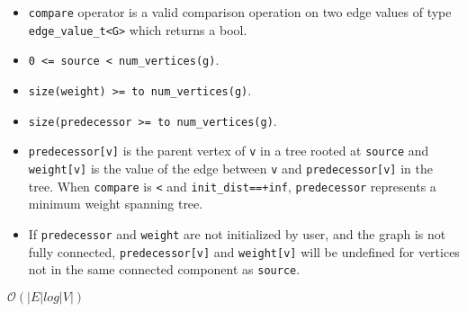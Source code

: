{\small
      
}

\begin{itemdescr}
      \pnum\mandates
            \begin{itemize}
                  \item
                        \lstinline{compare} operator is a valid comparison operation on two edge values of type \lstinline{edge_value_t<G>} which returns a bool.
            \end{itemize}
      \pnum\hardprecond
            \begin{itemize}
                  \item
                        \lstinline{0 <= source < num_vertices(g)}.
                  \item
                        \lstinline{size(weight) >= to num_vertices(g)}.
                  \item
                        \lstinline{size(predecessor >= to num_vertices(g)}.
            \end{itemize}
      \pnum\effects
            \begin{itemize}
                  \item
                        \lstinline{predecessor[v]} is the parent vertex of \lstinline{v} in a tree rooted at \lstinline{source} and \lstinline{weight[v]} is the value of the edge between \lstinline{v} and \lstinline{predecessor[v]} in the tree. When \lstinline{compare} is \lstinline{<} and \lstinline{init_dist==+inf}, \lstinline{predecessor} represents a minimum weight spanning tree.
                  \item
                        If \lstinline{predecessor} and \lstinline{weight} are not initialized by user, and the graph is not fully connected, \lstinline{predecessor[v]} and \lstinline{weight[v]} will be undefined for vertices not in the same connected component as \lstinline{source}.
            \end{itemize}
      \pnum\complexity $\mathcal{O}(|E|log|V|)$ \\
\end{itemdescr}


